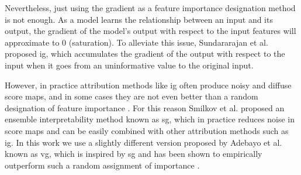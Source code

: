 Nevertheless, just using the gradient as a feature importance designation method is not enough. As a model learns the relationship between an input and its output, the gradient of the model's output with respect to the input features will approximate to 0 (saturation). 
To alleviate this issue, Sundararajan et al. \cite{sundararajan2017axiomatic} proposed \gls{ig}, which accumulates the gradient of the output with respect to the input when it goes from an uninformative value to the original input.

However, in practice attribution methods like \gls{ig} often produce noisy and diffuse score maps, and in some cases they are not even better than a random designation of feature importance \cite{hooker2018benchmark}. 
For this reason Smilkov et al. \cite{Smilkov_smoothgrad} proposed an ensemble interpretability method known as \gls{sg}, which in practice reduces noise in score maps and can be easily combined with other attribution methods such as  \gls{ig}. 
In this work we use a slightly different version proposed by Adebayo et al. \cite{adebayo2018local} known as \gls{vg}, which is inspired by \gls{sg} and has been shown to empirically outperform such a random assignment of importance \cite{hooker2018benchmark}.
